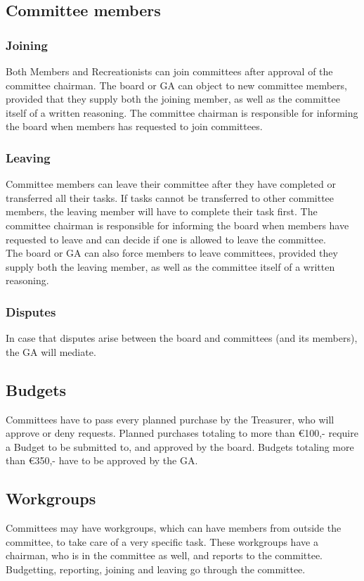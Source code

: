 \documentclass[a4paper]{article}
\begin{document}
\subsection{Committee members}
\subsubsection{Joining}
Both Members and Recreationists can join committees after approval of the committee chairman. The board or GA can object to new committee members, provided that they supply both the joining member, as well as the committee itself of a written reasoning. The committee chairman is responsible for informing the board when members has requested to join committees.

\subsubsection{Leaving}
Committee members can leave their committee after they have completed or transferred all their tasks. If tasks cannot be transferred to other committee members, the leaving member will have to complete their task first. The committee chairman is responsible for informing the board when members have requested to leave and can decide if one is allowed to leave the committee. \\ 

The board or GA can also force members to leave committees, provided they supply both the leaving member, as well as the committee itself of a written reasoning.

\subsubsection{Disputes}
In case that disputes arise between the board and committees (and its members), the GA will mediate.

\subsection{Budgets}
Committees have to pass every planned purchase by the Treasurer, who will approve or deny requests. Planned purchases totaling to more than €100,- require a Budget to be submitted to, and approved by the board. Budgets totaling more than €350,- have to be approved by the GA.

\subsection{Workgroups}
Committees may have workgroups, which can have members from outside the committee, to take care of a very specific task. These workgroups have a chairman, who is in the committee as well, and reports to the committee. Budgetting, reporting, joining and leaving go through the committee.
\end{document}
